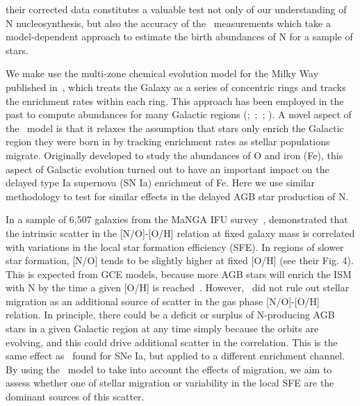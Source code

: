 \documentclass[ms.tex]{subfiles}
\begin{document}
their corrected data constitutes a valuable test not only of our understanding
of N nucleosynthesis, but also the accuracy of the~\citet{Vincenzo2021}
measurements which take a model-dependent approach to estimate the birth
abundances of N for a sample of stars.
\par
We make use the multi-zone chemical evolution model for the Milky Way
published in~\citet{Johnson2021}, which treats the Galaxy as a series of
concentric rings and tracks the enrichment rates within each ring.
This approach has been employed in the past to compute abundances for many
Galactic regions (\citealp{Matteucci1989, Wyse1989, Prantzos1995,
Schoenrich2009};~\citealp*{Minchev2013, Minchev2014};~\citealp{Minchev2017};
\citealp*{Sharma2020}).
A novel aspect of the~\citet{Johnson2021} model is that it relaxes the
assumption that stars only enrich the Galactic region they were born in by
tracking enrichment rates as stellar populations migrate.
Originally developed to study the abundances of O and iron (Fe), this aspect of
Galactic evolution turned out to have an important impact on the delayed type
Ia supernova (SN Ia) enrichment of Fe.
Here we use similar methodology to test for similar effects in the delayed AGB
star production of N.
\par
In a sample of 6,507 galaxies from the MaNGA IFU survey~\citep{Bundy2015},
\citet{Schaefer2020} demonstrated that the intrinsic scatter in the [N/O]-[O/H]
relation at fixed galaxy mass is correlated with variations in the local star
formation efficiency (SFE).
In regions of slower star formation, [N/O] tends to be slightly higher at fixed
[O/H] (see their Fig. 4).
This is expected from GCE models, because more AGB stars will enrich the ISM
with N by the time a given [O/H] is reached~\citep[e.g.][]{Molla2006,
Vincenzo2016a}.
However,~\citet{Schaefer2020} did not rule out stellar migration as an
additional source of scatter in the gas phase [N/O]-[O/H] relation.
In principle, there could be a deficit or surplus of N-producing AGB stars in a
given Galactic region at any time simply because the orbits are evolving, and
this could drive additional scatter in the correlation.
This is the same effect as~\citet{Johnson2021} found for SNe Ia, but applied to
a different enrichment channel.
By using the~\citet{Johnson2021} model to take into account the effects of
migration, we aim to assess whether one of stellar migration or variability in
the local SFE are the dominant sources of this scatter.
\end{document}
